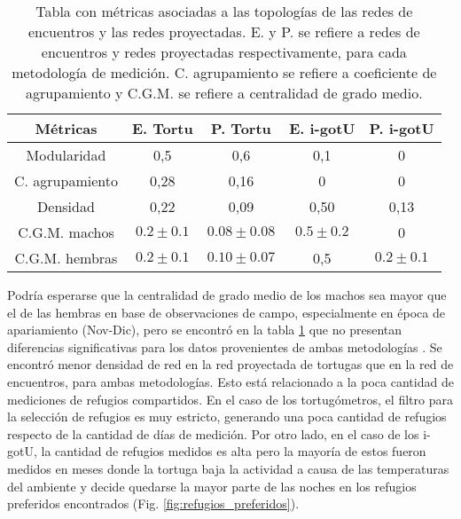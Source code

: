 \begin{table}[ht]
    \centering
    \begin{tabular}{|c|c|c|c|c|}
    \hline
    Métricas          & E. Tortu   & P. Tortu      & E. i-gotU   & P. i-gotU    \\ \hline
    Modularidad       & 0,5         & 0,6           & 0,1        & 0            \\ \hline
    C. agrupamiento & 0,28        & 0,16          & 0           & 0            \\ \hline
    Densidad          & 0,22        & 0,09          & 0,50         & 0,13          \\ \hline
    C.G.M. machos     & $0.2\pm0.1$ & $0.08\pm0.08$ & $0.5\pm0.2$ & 0            \\ \hline
    C.G.M. hembras    & $0.2\pm0.1$ & $0.10\pm0.07$ & 0,5         & $0.2\pm0.1 $ \\ \hline
    \end{tabular}
    \caption[Tabla con métricas asociadas a las tipologías de las redes de encuentros y las redes proyectadas.]{Tabla con métricas asociadas a las topologías de las redes de encuentros y las redes proyectadas. E. y P. se refiere a redes de encuentros y redes proyectadas respectivamente, para cada metodología de medición. C. agrupamiento se refiere a coeficiente de agrupamiento y C.G.M. se refiere a centralidad de grado medio.}
    \label{tab:metricas_topologia_redes}
\end{table}
Podría esperarse que la centralidad de grado medio de los machos sea mayor que el de las hembras en base de observaciones de campo, especialmente en época de apariamiento (Nov-Dic), pero se encontró en la tabla \ref{tab:metricas_topologia_redes} que no presentan diferencias significativas para los datos provenientes de ambas metodologías \cite{Erika}. Se encontró menor densidad de red en la red proyectada de tortugas que en la red de encuentros, para ambas metodologías. Esto está relacionado a la poca cantidad de mediciones de refugios compartidos. En el caso de los tortugómetros, el filtro para la selección de refugios es muy estricto, generando una poca cantidad de refugios respecto de la cantidad de días de medición. Por otro lado, en el caso de los i-gotU, la cantidad de refugios medidos es alta pero la mayoría de estos fueron medidos en meses donde la tortuga baja la actividad a causa de las temperaturas del ambiente y decide quedarse la mayor parte de las noches en los refugios preferidos encontrados (Fig. \ref{fig:refugios_preferidos}).
 
